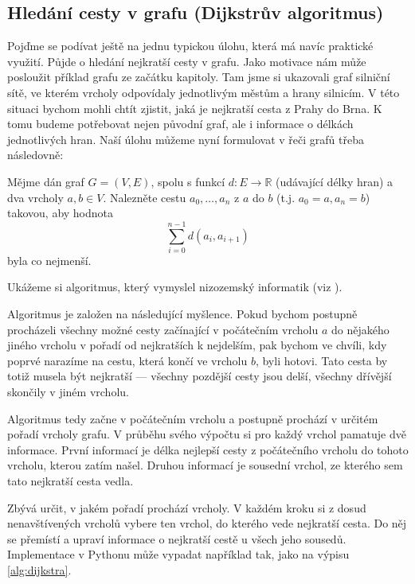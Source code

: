 \subsection*{Hledání cesty v grafu (Dijkstrův algoritmus)}

Pojďme se podívat ještě na jednu typickou úlohu, která má navíc praktické využití. Půjde o hledání nejkratší cesty v grafu. Jako motivace nám může posloužit příklad
grafu ze začátku kapitoly. Tam jsme si ukazovali graf silniční sítě, ve kterém vrcholy odpovídaly jednotlivým městům a hrany silnicím. V této situaci bychom mohli chtít
zjistit, jaká je nejkratší cesta z Prahy do Brna. K tomu budeme potřebovat nejen
původní graf, ale i informace o délkách jednotlivých hran. Naší úlohu můžeme nyní
formulovat v řeči grafů třeba následovně:

\begin{question} Mějme dán graf $G=(V,E)$, spolu s funkcí $d:E\to\mathbb{R}$ (udávající
délky hran) a dva vrcholy $a,b\in V$. Nalezněte cestu $a_0,\ldots,a_n$ z $a$ do $b$ (t.j. $a_0=a, a_n=b$) takovou, aby hodnota
\begin{displaymath}
 \sum_{i=0}^{n-1} d(a_i,a_{i+1})
\end{displaymath}
byla co nejmenší.
\end{question}

Ukážeme si algoritmus, který vymyslel nizozemský informatik  (viz \cite{Dijkstra:59}). 

Algoritmus je založen na následující myšlence. Pokud bychom postupně procházeli všechny možné cesty začínající v počátečním vrcholu 
$a$ do nějakého jiného vrcholu v pořadí od nejkratších k nejdelším, pak bychom ve chvíli, kdy poprvé narazíme na cestu, která končí ve vrcholu $b$, 
byli hotovi. Tato cesta by totiž musela být nejkratší --- všechny pozdější cesty jsou delší, všechny dřívější skončily v jiném vrcholu.

Algoritmus tedy začne v počátečním vrcholu a postupně prochází v určitém pořadí 
vrcholy grafu. V průběhu svého výpočtu si pro každý vrchol pamatuje dvě informace. 
První informací je délka nejlepší cesty z počátečního vrcholu do tohoto vrcholu, 
kterou zatím našel. Druhou informací je sousední vrchol, ze kterého sem tato nejkratší cesta vedla. 

Zbývá určit, v jakém pořadí prochází vrcholy. V každém kroku si z dosud nenavštívených vrcholů
vybere ten vrchol, do kterého vede nejkratší cesta. Do něj se přemístí a upraví informace
o nejkratší cestě u všech jeho sousedů. Implementace v Pythonu může vypadat například
tak, jako na výpisu \ref{alg:dijkstra}.

